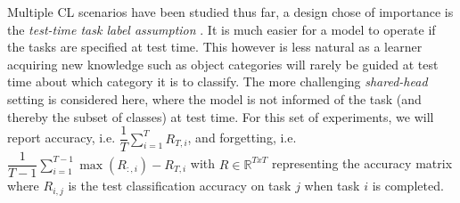 \documentclass[colorinlistoftodos]{article} %
\begin{document}
Multiple CL scenarios have been studied thus far, a design chose of  importance is the \textit{test-time task label assumption} \citep{farquhar2018towards}. It is much easier for a model to operate if the tasks are specified at test time. This however is less natural as a learner acquiring new knowledge  such as object categories will rarely be guided at test time about which category it is to classify. The more challenging \textit{shared-head} setting is considered here, where the model is not informed of the task (and thereby the subset of classes) at test time. 
For this set of experiments, we will report accuracy, i.e. $\dfrac{1}{T} \sum_{i=1}^T R_{T,i}$, and forgetting, i.e. $\dfrac{1}{T-1} \sum_{i=1}^{T-1} \max(R_{:,i}) - R_{T,i}$
with $R \in \mathbb{R}^{TxT}$ representing the accuracy matrix where $R_{i,j}$ is the test classification accuracy on task $j$ when task $i$ is completed.
\end{document}
